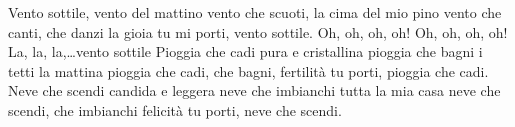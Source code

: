 \beginverse
Vento sottile, vento del mattino
vento che scuoti, la cima del mio pino
vento che canti, che danzi
la gioia tu mi porti, vento sottile.
\endverse
\beginchorus
Oh, oh, oh, oh!
Oh, oh, oh, oh!
La, la, la,\dots vento sottile
\endchorus
\beginverse
Pioggia che cadi pura e cristallina
pioggia che bagni i tetti la mattina
pioggia che cadi, che bagni,
fertilità tu porti, pioggia che cadi.
Neve che scendi candida e leggera
neve che imbianchi tutta la mia casa
neve che scendi, che imbianchi
felicità tu porti, neve che scendi.
\endverse
\endsong
